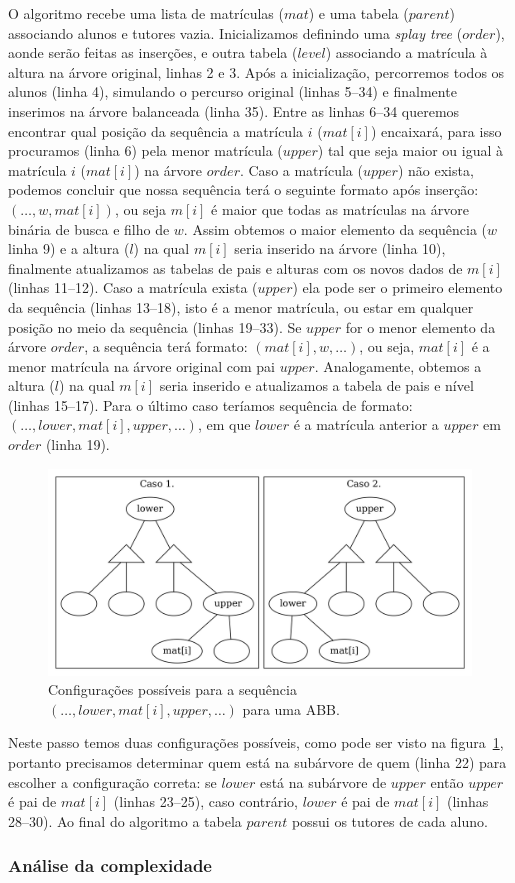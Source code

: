 O algoritmo recebe uma lista de matrículas ($mat$) e uma tabela ($parent$) associando alunos e
tutores vazia. Inicializamos definindo uma \textit{splay tree} ($order$), aonde
serão feitas as inserções, e outra tabela ($level$) associando a matrícula à
altura na árvore original, linhas 2 e 3. Após a inicialização, percorremos todos
os alunos (linha 4), simulando o percurso original (linhas 5--34) e finalmente
inserimos na árvore balanceada (linha 35). Entre as linhas 6--34 queremos
encontrar qual posição da sequência a matrícula $i$ ($mat[i]$) encaixará,
para isso procuramos (linha 6) pela menor matrícula ($upper$) tal que seja maior
ou igual à matrícula $i$ ($mat[i]$) na árvore $order$. Caso a matrícula ($upper$) não
exista, podemos concluir que nossa sequência terá o seguinte formato após inserção: $(\ldots,
w,mat[i])$, ou seja $m[i]$ é maior que todas as matrículas na árvore binária de
busca e filho de $w$. Assim obtemos o maior elemento da sequência ($w$ linha
9) e a altura ($l$) na qual $m[i]$ seria inserido na árvore (linha 10),
finalmente atualizamos as tabelas de pais e alturas com os novos dados de $m[i]$
(linhas 11--12). Caso a matrícula exista ($upper$) ela pode ser o primeiro
elemento da sequência (linhas 13--18), isto é a menor matrícula, ou estar em qualquer posição no
meio da sequência (linhas 19--33). Se $upper$ for o menor elemento da árvore
$order$, a sequência terá formato: $(mat[i], w, \ldots)$, ou seja, $mat[i]$ é a
menor matrícula na árvore original com pai $upper$. Analogamente, obtemos a altura ($l$) na qual
$m[i]$ seria inserido e atualizamos a tabela de pais e nível (linhas 15--17).
Para o último caso teríamos sequência de formato: $(\ldots, lower, mat[i],
upper, \ldots)$, em que $lower$ é a matrícula anterior a $upper$ em $order$
(linha 19).
\begin{figure}[!htb]
  \centering
  \includegraphics[width=0.7\linewidth]{lxu.png}
  \caption{Configurações possíveis para a sequência $(\ldots, lower, mat[i], upper,
    \ldots)$ para uma ABB.}
  \label{fig:lxu}
\end{figure}
Neste passo temos duas configurações possíveis, como pode ser visto
na figura~\ref{fig:lxu}, portanto precisamos determinar quem está na subárvore
de quem (linha 22) para escolher a configuração correta: se $lower$ está na
subárvore de $upper$ então $upper$ é pai de $mat[i]$ (linhas 23--25), caso
contrário, $lower$ é pai de $mat[i]$ (linhas 28--30). Ao final do algoritmo a
tabela $parent$ possui os tutores de cada aluno.

\subsubsection{Análise da complexidade}
